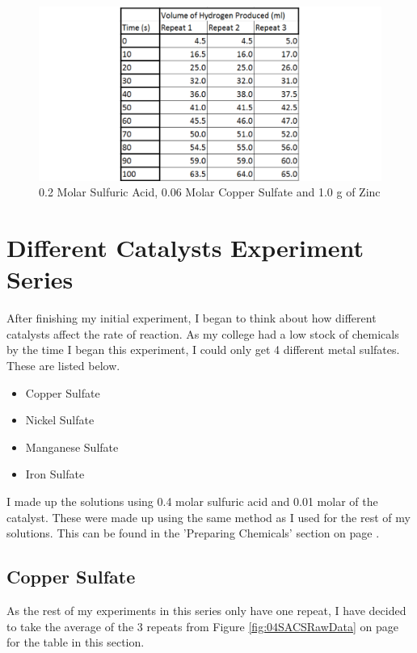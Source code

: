 \begin{figure}[H]
    \includegraphics[width=\textwidth]{./Experiment/Images/3ChangeCatalyst/006Molar.pdf}
    \caption{0.2 Molar Sulfuric Acid, 0.06 Molar Copper Sulfate and 1.0 g of Zinc} \label{fig:006MolarCSRawData}
\end{figure}



\section{Different Catalysts Experiment Series}

After finishing my initial experiment, I began to think about how different catalysts affect the rate of reaction. As my college had a low stock of chemicals by the time I began this experiment, I could only get 4 different metal sulfates. These are listed below.

\begin{itemize}
\item Copper Sulfate
\item Nickel Sulfate
\item Manganese Sulfate
\item Iron Sulfate
\end{itemize}

I made up the solutions using 0.4 molar sulfuric acid and 0.01 molar of the catalyst. These were made up using the same method as I used for the rest of my solutions. This can be found in the 'Preparing Chemicals' section on page \pageref{Preparing Chemicals}.

	\subsection{Copper Sulfate}

As the rest of my experiments in this series only have one repeat, I have decided to take the average of the 3 repeats from Figure \ref{fig:04SACSRawData} on page \pageref{fig:04SACSRawData} for the table in this section.

